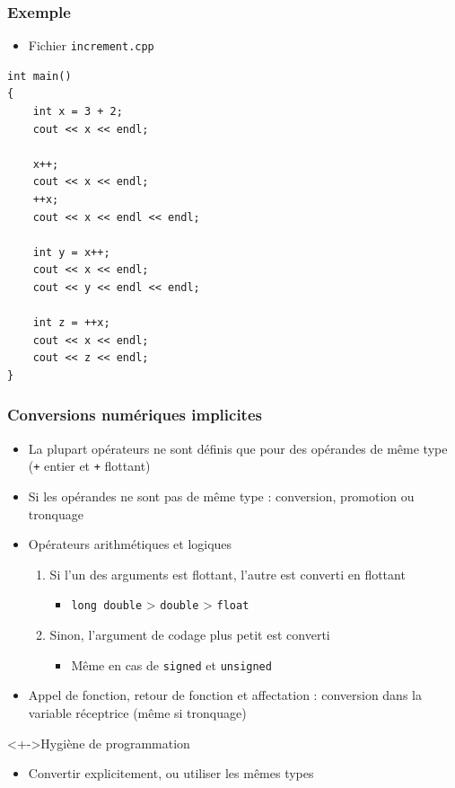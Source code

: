 \begin{frame}[containsverbatim]
\frametitle{Exemple}
\begin{itemize}
\item Fichier \texttt{increment.cpp}
\end{itemize}
\begin{lstlisting}
int main()
{
	int x = 3 + 2;
	cout << x << endl;

	x++;
	cout << x << endl;
	++x;
	cout << x << endl << endl;

	int y = x++;
	cout << x << endl;
	cout << y << endl << endl;

	int z = ++x;
	cout << x << endl;
	cout << z << endl;
}
\end{lstlisting}
\end{frame}

\begin{frame}
\frametitle{Conversions numériques implicites}
\begin{itemize}[<+->]
\item La plupart opérateurs ne sont définis que pour des opérandes de même type (\texttt{+} entier et \texttt{+} flottant)
\item Si les opérandes ne sont pas de même type : conversion, promotion ou tronquage
\item Opérateurs arithmétiques et logiques
	\begin{enumerate}
	\item Si l'un des arguments est flottant, l'autre est converti en flottant
		\begin{itemize}
		\item \lstinline|long double| > \lstinline|double| > \lstinline|float|
		\end{itemize}
	\item Sinon, l'argument de codage plus petit est converti
		\begin{itemize}
		\item Même en cas de \lstinline|signed| et \lstinline|unsigned|
		\end{itemize}
	\end{enumerate}
\item Appel de fonction, retour de fonction et affectation  : conversion dans la variable réceptrice (même si tronquage)
\end{itemize}
\begin{block}<+->{Hygiène de programmation}
	\begin{itemize}[<+->]
	\item Convertir explicitement, ou utiliser les mêmes types
	\end{itemize}
\end{block}
\end{frame}

